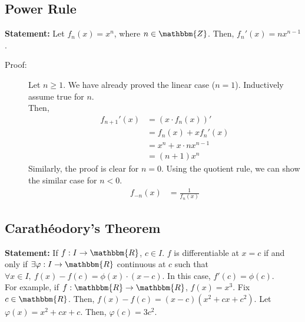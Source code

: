 \documentclass[10pt]{extarticle}
\newcommand{\Z}{\mathbbm{Z}}
\newcommand{\R}{\mathbbm{R}}
\begin{document}
  \subsection{Power Rule}%
   \textbf{Statement:} Let $f_n(x) = x^n$, where $n\in \Z$. Then, $f_n'(x) = nx^{n-1}$.
    \begin{description}
      \item[Proof:] Let $n\geq 1$. We have already proved the linear case ($n=1$). Inductively assume true for $n$.\\

        Then, 
        \begin{align*}
          f_{n+1}'(x) &= (x \cdot f_n(x))'\\
                      &= f_n(x) + xf_n'(x)\\
                      &= x^n + x \cdot nx^{n-1}\\
                      &= (n+1)x^{n}
        \end{align*}
        Similarly, the proof is clear for $n=0$. Using the quotient rule, we can show the similar case for $n < 0$.
        \begin{align*}
          f_{-n}(x) &= \frac{1}{f_n(x)} \tag*{$n = 1,2,3,\dots$}
        \end{align*}
    \end{description}
  \subsection{Carathéodory's Theorem}%
    \textbf{Statement:} If $f: I\rightarrow \R$, $c\in I$. $f$ is differentiable at $x=c$ if and only if $\exists \varphi: I\rightarrow \R$ continuous at $c$ such that $\forall x\in I,~f(x) - f(c) = \phi(x) \cdot (x-c)$. In this case, $f'(c) = \phi(c)$.\\

    For example, if $f: \R\rightarrow \R$, $f(x) = x^3$. Fix $c\in\R$. Then, $f(x) - f(c) = (x-c)(x^2 + cx + c^2)$. Let $\varphi(x) = x^2 + cx + c$. Then, $\varphi(c) = 3c^2$.
\end{document}
